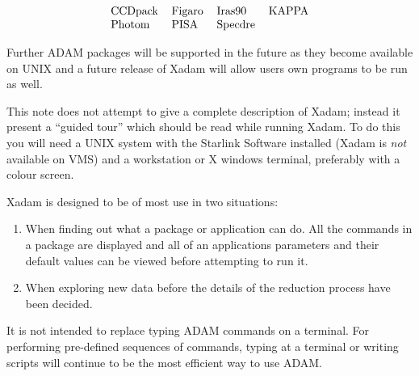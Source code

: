 \setlength{\tabcolsep}{0.3in}
\[\begin{tabular}{llll}
CCDpack &Figaro &Iras90 &KAPPA \\
Photom &PISA &Specdre
\end{tabular}\]

Further ADAM packages will be supported in the future as they become available
on UNIX and a future release of Xadam will allow users own programs to be
run as well.

This note does not attempt to give a complete description of Xadam; instead
it present a ``guided tour'' which should be read while running Xadam. To do
this you will need a UNIX system with the Starlink Software installed (Xadam
is {\em not} available on VMS) and a workstation or X windows terminal,
preferably with a colour screen.

Xadam is designed to be of most use in two situations:

\begin{enumerate}

\item When finding out what a package or application can do. All the commands
in a package are displayed and all of an applications parameters and their
default values can be viewed before attempting to run it.

\item When exploring new data before the details of the reduction process
have been decided.

\end{enumerate}

It is not intended to replace typing ADAM commands on a terminal. For
performing pre-defined sequences of commands, typing at a terminal or writing
scripts will continue to be the most efficient way to use ADAM.

\newpage
